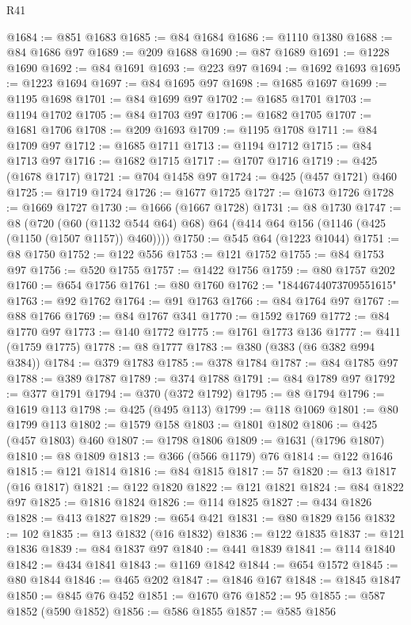 \begin{lexlean}{R41}
\begin{coremodule}
{{{{{{{{{{{{{{{{{{{{{{{{{{{{{{{{{{{{{{{{{{{{{{{{{{{{{{{{{{{{{{{{{{{{{{{{{{{{{{{{{{{{{{{@1684 := @851 @1683
@1685 := @84 @1684
@1686 := @1110 @1380
@1688 := @84 @1686 @97
@1689 := @209 @1688
@1690 := @87 @1689
@1691 := @1228 @1690
@1692 := @84 @1691
@1693 := @223 @97
@1694 := @1692 @1693
@1695 := @1223 @1694
@1697 := @84 @1695 @97
@1698 := @1685 @1697
@1699 := @1195 @1698
@1701 := @84 @1699 @97
@1702 := @1685 @1701
@1703 := @1194 @1702
@1705 := @84 @1703 @97
@1706 := @1682 @1705
@1707 := @1681 @1706
@1708 := @209 @1693
@1709 := @1195 @1708
@1711 := @84 @1709 @97
@1712 := @1685 @1711
@1713 := @1194 @1712
@1715 := @84 @1713 @97
@1716 := @1682 @1715
@1717 := @1707 @1716
@1719 := @425 (@1678 @1717)
@1721 := @704 @1458 @97
@1724 := @425 (@457 @1721) @460
@1725 := @1719 @1724
@1726 := @1677 @1725
@1727 := @1673 @1726
@1728 := @1669 @1727
@1730 := @1666 (@1667 @1728)
@1731 := @8 @1730
@1747 := @8
    (@720 (@60 (@1132 @544 @64) @68) @64 (@414 @64 @156 (@1146 (@425 (@1150 (@1507 @1157)) @460))))
@1750 := @545 @64 (@1223 @1044)
@1751 := @8 @1750
@1752 := @122 @556
@1753 := @121 @1752
@1755 := @84 @1753 @97
@1756 := @520 @1755
@1757 := @1422 @1756
@1759 := @80 @1757 @202
@1760 := @654 @1756
@1761 := @80 @1760
@1762 := "18446744073709551615"
@1763 := @92 @1762
@1764 := @91 @1763
@1766 := @84 @1764 @97
@1767 := @88 @1766
@1769 := @84 @1767 @341
@1770 := @1592 @1769
@1772 := @84 @1770 @97
@1773 := @140 @1772
@1775 := @1761 @1773 @136
@1777 := @411 (@1759 @1775)
@1778 := @8 @1777
@1783 := @380 (@383 (@6 @382 @994 @384))
@1784 := @379 @1783
@1785 := @378 @1784
@1787 := @84 @1785 @97
@1788 := @389 @1787
@1789 := @374 @1788
@1791 := @84 @1789 @97
@1792 := @377 @1791
@1794 := @370 (@372 @1792)
@1795 := @8 @1794
@1796 := @1619 @113
@1798 := @425 (@495 @113)
@1799 := @118 @1069
@1801 := @80 @1799 @113
@1802 := @1579 @158
@1803 := @1801 @1802
@1806 := @425 (@457 @1803) @460
@1807 := @1798 @1806
@1809 := @1631 (@1796 @1807)
@1810 := @8 @1809
@1813 := @366 (@566 @1179) @76
@1814 := @122 @1646
@1815 := @121 @1814
@1816 := @84 @1815
@1817 := 57
@1820 := @13 @1817 (@16 @1817)
@1821 := @122 @1820
@1822 := @121 @1821
@1824 := @84 @1822 @97
@1825 := @1816 @1824
@1826 := @114 @1825
@1827 := @434 @1826
@1828 := @413 @1827
@1829 := @654 @421
@1831 := @80 @1829 @156
@1832 := 102
@1835 := @13 @1832 (@16 @1832)
@1836 := @122 @1835
@1837 := @121 @1836
@1839 := @84 @1837 @97
@1840 := @441 @1839
@1841 := @114 @1840
@1842 := @434 @1841
@1843 := @1169 @1842
@1844 := @654 @1572
@1845 := @80 @1844
@1846 := @465 @202
@1847 := @1846 @167
@1848 := @1845 @1847
@1850 := @845 @76 @452
@1851 := @1670 @76
@1852 := 95
@1855 := @587 @1852 (@590 @1852)
@1856 := @586 @1855
@1857 := @585 @1856
}}}}}}}}}}}}}}}}}}}}}}}}}}}}}}}}}}}}}}}}}}}}}}}}}}}}}}}}}}}}}}}}}}}}}}}}}}}}}}}}}}}}}}}
\end{coremodule}
\end{lexlean}
